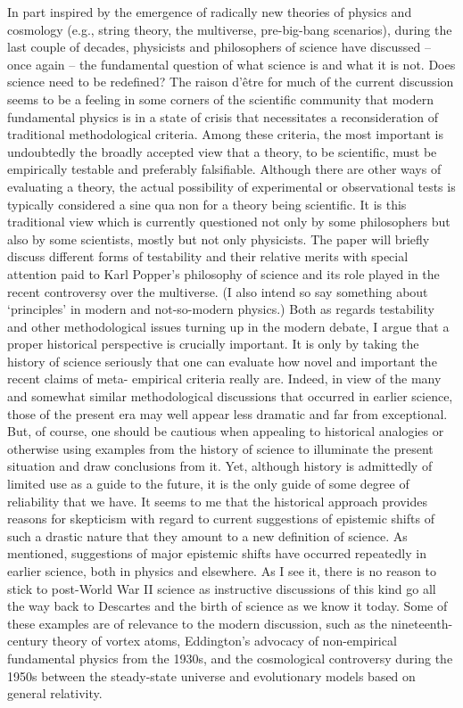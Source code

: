 \documentclass[11pt]{article}
\begin{document}
In part inspired by the emergence of radically new theories of physics and
cosmology (e.g., string theory, the multiverse, pre-big-bang scenarios), during the
last couple of decades, physicists and philosophers of science have discussed – once
again – the fundamental question of what science is and what it is not. Does science
need to be redefined? The raison d’être for much of the current discussion seems to
be a feeling in some corners of the scientific community that modern fundamental
physics is in a state of crisis that necessitates a reconsideration of traditional
methodological criteria. Among these criteria, the most important is undoubtedly
the broadly accepted view that a theory, to be scientific, must be empirically testable
and preferably falsifiable. Although there are other ways of evaluating a theory, the
actual possibility of experimental or observational tests is typically considered a sine
qua non for a theory being scientific. It is this traditional view which is currently
questioned not only by some philosophers but also by some scientists, mostly but
not only physicists.
The paper will briefly discuss different forms of testability and their relative merits
with special attention paid to Karl Popper’s philosophy of science and its role played
in the recent controversy over the multiverse. (I also intend so say something about
‘principles’ in modern and not-so-modern physics.) Both as regards testability and
other methodological issues turning up in the modern debate, I argue that a proper
historical perspective is crucially important. It is only by taking the history of science
seriously that one can evaluate how novel and important the recent claims of meta-
empirical criteria really are. Indeed, in view of the many and somewhat similar
methodological discussions that occurred in earlier science, those of the present era
may well appear less dramatic and far from exceptional. But, of course, one should
be cautious when appealing to historical analogies or otherwise using examples
from the history of science to illuminate the present situation and draw conclusions
from it. Yet, although history is admittedly of limited use as a guide to the future, it
is the only guide of some degree of reliability that we have. It seems to me that the
historical approach provides reasons for skepticism with regard to current
suggestions of epistemic shifts of such a drastic nature that they amount to a new
definition of science.
As mentioned, suggestions of major epistemic shifts have occurred repeatedly in
earlier science, both in physics and elsewhere. As I see it, there is no reason to stick
to post-World War II science as instructive discussions of this kind go all the way
back to Descartes and the birth of science as we know it today. Some of these
examples are of relevance to the modern discussion, such as the nineteenth-century
theory of vortex atoms, Eddington’s advocacy of non-empirical fundamental physics
from the 1930s, and the cosmological controversy during the 1950s between the
steady-state universe and evolutionary models based on general relativity.
\end{document}
